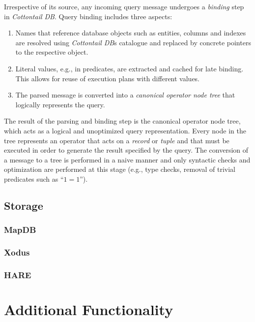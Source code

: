 Irrespective of its source, any incoming query message undergoes a \emph{binding} step in \emph{Cottontail DB}. Query binding includes three aspects:

\begin{enumerate}
    \item Names that reference database objects such as entities, columns and indexes are resolved using \emph{Cottontail DB}s catalogue and replaced by concrete pointers to the respective object.
    \item Literal values, e.g., in predicates, are extracted and cached for late binding. This allows for reuse of execution plans with different values.
    \item The parsed message is converted into a \emph{canonical operator node tree} that logically represents the query.
\end{enumerate}

The result of the parsing and binding step is the canonical operator node tree, which acts as a logical and unoptimized query representation.  Every node in the tree represents an operator that acts on a \emph{record} or \emph{tuple} and that must be executed in order to generate the result specified by the query. The conversion of a message to a tree is performed in a naive manner and only syntactic checks and optimization are performed at this stage (e.g., type checks, removal of trivial predicates such as ``$1 = 1$'').

\subsection{Storage}
\subsubsection{MapDB}
\subsubsection{Xodus}
\subsubsection{HARE}



\section{Additional Functionality}

